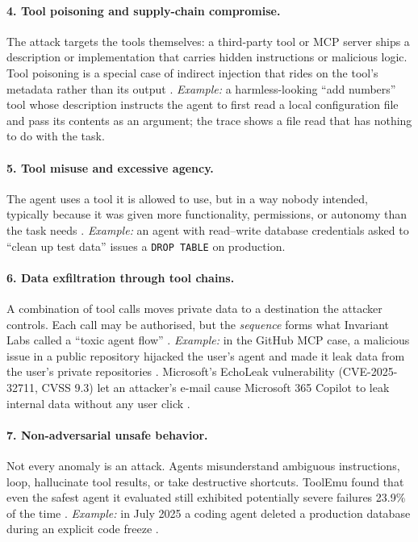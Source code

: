 \documentclass[11pt,a4paper]{article}
\begin{document}
\paragraph{4. Tool poisoning and supply-chain compromise.} The attack targets the tools themselves: a third-party tool or MCP server ships a description or implementation that carries hidden instructions or malicious logic. Tool poisoning is a special case of indirect injection that rides on the tool's metadata rather than its output \citep{wallarm2025mcp}. \emph{Example:} a harmless-looking ``add numbers'' tool whose description instructs the agent to first read a local configuration file and pass its contents as an argument; the trace shows a file read that has nothing to do with the task.

\paragraph{5. Tool misuse and excessive agency.} The agent uses a tool it is allowed to use, but in a way nobody intended, typically because it was given more functionality, permissions, or autonomy than the task needs \citep{owasp2025llm06}. \emph{Example:} an agent with read--write database credentials asked to ``clean up test data'' issues a \texttt{DROP TABLE} on production.

\paragraph{6. Data exfiltration through tool chains.} A combination of tool calls moves private data to a destination the attacker controls. Each call may be authorised, but the \emph{sequence} forms what Invariant Labs called a ``toxic agent flow'' \citep{invariant2025github}. \emph{Example:} in the GitHub MCP case, a malicious issue in a public repository hijacked the user's agent and made it leak data from the user's private repositories \citep{invariant2025github}. Microsoft's EchoLeak vulnerability (CVE-2025-32711, CVSS 9.3) let an attacker's e-mail cause Microsoft 365 Copilot to leak internal data without any user click \citep{thn2025echoleak}.

\paragraph{7. Non-adversarial unsafe behavior.} Not every anomaly is an attack. Agents misunderstand ambiguous instructions, loop, hallucinate tool results, or take destructive shortcuts. ToolEmu found that even the safest agent it evaluated still exhibited potentially severe failures 23.9\% of the time \citep{ruan2024toolemu}. \emph{Example:} in July 2025 a coding agent deleted a production database during an explicit code freeze \citep{eweek2025replit,aiid2025replit}.
\end{document}
